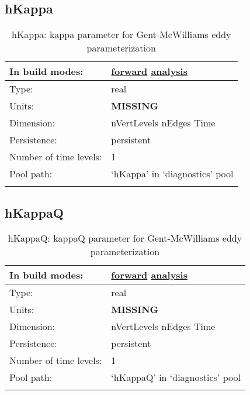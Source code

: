 \subsection[hKappa]{hKappa}
\label{subsec:var_sec_diagnostics_hKappa}
\begin{center}
\begin{longtable}{| p{2.0in} | p{4.0in} |}
        \hline 
        In build modes: & \hyperref[subsec:forward_var_tab_diagnostics]{forward} \hyperref[subsec:analysis_var_tab_diagnostics]{analysis} \\
        \hline 
        Type: & real \\
        \hline 
        Units: & {\bf \color{red} MISSING} \\
        \hline 
        Dimension: & nVertLevels nEdges Time \\
        \hline 
        Persistence: & persistent \\
        \hline 
        Number of time levels: & 1 \\
        \hline 
            Pool path: & `hKappa' in `diagnostics' pool \\
		 \hline 
    \caption{hKappa: kappa parameter for Gent-McWilliams eddy parameterization}
\end{longtable}
\end{center}
\subsection[hKappaQ]{hKappaQ}
\label{subsec:var_sec_diagnostics_hKappaQ}
\begin{center}
\begin{longtable}{| p{2.0in} | p{4.0in} |}
        \hline 
        In build modes: & \hyperref[subsec:forward_var_tab_diagnostics]{forward} \hyperref[subsec:analysis_var_tab_diagnostics]{analysis} \\
        \hline 
        Type: & real \\
        \hline 
        Units: & {\bf \color{red} MISSING} \\
        \hline 
        Dimension: & nVertLevels nEdges Time \\
        \hline 
        Persistence: & persistent \\
        \hline 
        Number of time levels: & 1 \\
        \hline 
            Pool path: & `hKappaQ' in `diagnostics' pool \\
		 \hline 
    \caption{hKappaQ: kappaQ parameter for Gent-McWilliams eddy parameterization}
\end{longtable}
\end{center}
